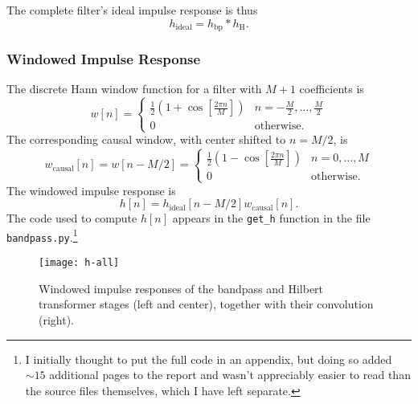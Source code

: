 \noindent The complete filter's ideal impulse response is thus
\begin{equation*}
    h_{\mathrm{ideal}} = h_{\mathrm{bp}} * h_{\mathrm{H}}.
\end{equation*}

\subsubsection{Windowed Impulse Response}

The discrete Hann window function for a filter with $ M + 1 $ coefficients is
\begin{equation*}%
    w[n] = 
    \begin{cases}
        \frac{1}{2} \left( 1 + \cos \left[ \frac{2\pi n}{M} \right] \right) & n = - \frac{M}{2}, \ldots, \frac{M}{2}\\
        0 & \text{otherwise}.
    \end{cases}
\end{equation*}
The corresponding causal window, with center shifted to $ n = M/2 $, is
\begin{equation*}
    w_{\mathrm{causal}}[n] = w[n - M/2] = 
    \begin{cases}
        \frac{1}{2} \left( 1 - \cos \left[ \frac{2\pi n}{M} \right] \right) & n = 0, \ldots, M\\
        0 & \text{otherwise}.
    \end{cases}
\end{equation*}
The windowed impulse response is
\begin{equation*}
    h[n] = h_{\mathrm{ideal}}[n - M/2] w_{\mathrm{causal}}[n].
\end{equation*}
The code used to compute $ h[n] $ appears in the \texttt{get\_h} function in the file \texttt{bandpass.py}.\footnote{I initially thought to put the full code in an appendix, but doing so added $ \sim 15 $ additional pages to the report and wasn't appreciably easier to read than the source files themselves, which I have left separate.}

\begin{figure}[htb!]
	\centering
	\texttt{[image: h-all]}
    \vspace{-3ex}
	\caption{Windowed impulse responses of the bandpass and Hilbert transformer stages (left and center), together with their convolution (right).}
	\label{fig:h-all}
\end{figure}

